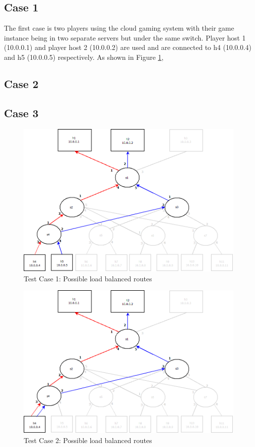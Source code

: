 \subsection{Case 1}
The first case is two players using the cloud gaming system with their game instance being in two separate servers but under the same switch. Player host 1 (10.0.0.1) and player host 2 (10.0.0.2) are used and are connected to h4 (10.0.0.4) and h5 (10.0.0.5) respectively. As shown in Figure \ref{fig:test1}, 

\subsection{Case 2}
\lipsum[1-1]

\subsection{Case 3}
\lipsum[1-1]

\begin{figure}[h]
 \includegraphics[width=\linewidth]{images/test1.png}
 \caption{Test Case 1: Possible load balanced routes}
 \label{fig:test1}
\end{figure}

\begin{figure}[h]
 \includegraphics[width=\linewidth]{images/test2.png}
 \caption{Test Case 2: Possible load balanced routes}
 \label{fig:test2}
\end{figure}

